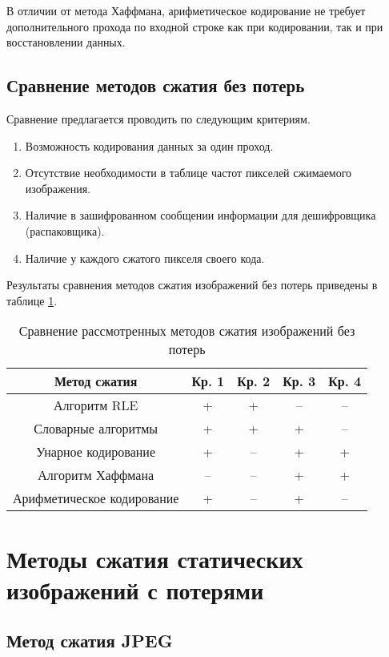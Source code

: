 В отличии от метода Хаффмана, арифметическое кодирование не требует дополнительного прохода по входной строке как при кодировании, так и при восстановлении данных.


\subsection{Сравнение методов сжатия без потерь}

Сравнение предлагается проводить по следующим критериям.
\begin{enumerate}
    \item Возможность кодирования данных за один проход.
    \item Отсутствие необходимости в таблице частот пикселей сжимаемого изображения.
    \item Наличие в зашифрованном сообщении информации для дешифровщика (распаковщика).
    \item Наличие у каждого сжатого пикселя своего кода.
\end{enumerate}

Результаты сравнения методов сжатия изображений без потерь приведены в таблице \ref{tbl:compare_realizations1}.
\begin{table}[H]
    \centering
	\caption{Сравнение рассмотренных методов сжатия изображений без потерь}
    \label{tbl:compare_realizations1}
	\begin{tabular}{|c|c|c|c|c|}
        \hline
        \textbf{Метод сжатия} & \textbf{Кр. 1} & \textbf{Кр. 2} & \textbf{Кр. 3} & \textbf{Кр. 4}
        \\ \hline
        Алгоритм RLE               & +  & +  & -- & -- \\ \hline
        Словарные алгоритмы        & +  & +  & +  & -- \\ \hline
        Унарное кодирование        & +  & -- & +  & +  \\ \hline
        Алгоритм Хаффмана          & -- & -- & +  & +  \\ \hline
        Арифметическое кодирование & +  & -- & +  & -- \\ \hline
    \end{tabular}
\end{table}

\section{Методы сжатия статических изображений с потерями}

\subsection{Метод сжатия JPEG}

